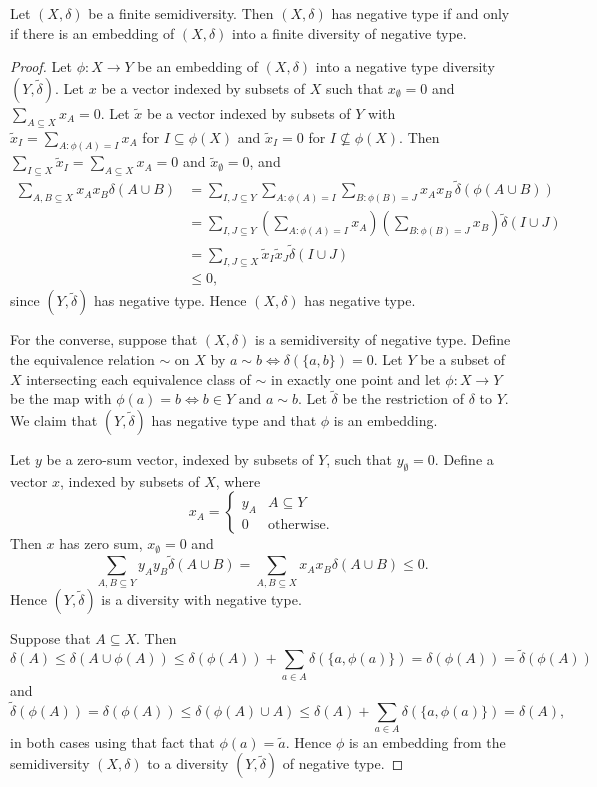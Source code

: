 \documentclass[10pt,a4paper]{amsart}
\newcommand{\td}{\widetilde{\delta}}
\begin{document}
\begin{proposition} \label{prop:negtype_properties}
Let $(X,\delta)$ be a finite semidiversity. Then $(X,\delta)$ has negative type if and only if there is an embedding of $(X,\delta)$ into a finite diversity of negative type.
\end{proposition}

\begin{proof}
Let $\phi:X \rightarrow Y$ be an embedding of $(X,\delta)$ into a negative type diversity $(Y,\td)$. 
Let $x$ be a vector indexed by subsets of $X$ such that $x_\emptyset = 0$ and $\sum_{A \subseteq X} x_A = 0$. Let $\tilde{x}$ be a vector indexed by subsets of $Y$ with $\tilde{x}_I = \sum_{A:\phi(A) = I} x_A$ for $I \subseteq \phi(X)$ and  $\tilde{x}_I = 0$ for $I \not \subseteq \phi(X)$. Then $\sum_{I \subseteq X} \tilde{x}_I = \sum_{A \subseteq X} x_A = 0$ and $\tilde{x}_\emptyset = 0$, and
    \begin{align*}
        \sum_{A,B \subseteq X} x_A x_B \delta(A \cup B) & = \sum_{I,J \subseteq Y} \sum_{A:\phi(A) = I} \sum_{B:\phi(B) = J} x_A x_B 
        \, \td(\phi(A \cup B)) \\
        & = \sum_{I,J \subseteq Y} \left(\sum_{A : \phi(A) = I} x_A \right) \left(\sum_{B : \phi(B) = J} x_B \right) \td(I \cup J) \\
        & =  \sum_{I,J \subseteq X} \tilde{x}_I \tilde{x}_J \td(I \cup J)  \\
        & \leq 0,
    \end{align*}
    since  $(Y,\td)$ has negative type. Hence $(X,\delta)$ has negative type.
    
  For the converse, suppose that $(X,\delta)$ is a semidiversity of negative type. Define the equivalence relation $\sim$ on $X$ by $a \sim b \Leftrightarrow \delta(\{a,b\})=0$. Let $Y$ be a subset of $X$ intersecting each equivalence class of $\sim$ in exactly one point and let $\phi:X \rightarrow Y$ be the map with $\phi(a) = b \Leftrightarrow b \in Y \mbox{ and }a \sim b$. Let $\td$ be the restriction of $\delta$ to $Y$. We claim that $(Y,\td)$ has negative type and that $\phi$ is an embedding. 
 
Let $y$ be a zero-sum vector, indexed by subsets of $Y$, such that $y_\emptyset = 0$. Define a vector $x$, indexed by subsets of $X$, where
\[x_A = \begin{cases} y_A & A \subseteq Y \\ 0 & \mbox{otherwise.} \end{cases}\]
Then $x$ has zero sum, $x_\emptyset = 0$ and 
\[\sum_{A,B \subseteq Y} y_A y_B \td(A \cup B) = \sum_{A,B \subseteq X} x_A x_B \delta(A \cup B) \leq 0.\]
Hence $(Y,\td)$ is a diversity with negative type.

Suppose that $A \subseteq X$. Then 
\[\delta(A) \leq \delta(A \cup \phi(A)) \leq \delta(\phi(A)) + \sum_{a \in A} \delta(\{a,\phi(a)\}) = \delta(\phi(A)) = \td(\phi(A))\]
and 
\[\td(\phi(A)) = \delta(\phi(A)) \leq \delta(\phi(A) \cup A) \leq \delta(A) + \sum_{a \in A} \delta(\{a,\phi(a)\}) = \delta(A),\]
in both cases using that fact that $\phi(a) =\tilde a$. Hence $\phi$ is an embedding from the semidiversity $(X,\delta)$ to a diversity $(Y,\td)$ of negative type.
\end{proof}
\end{document}
